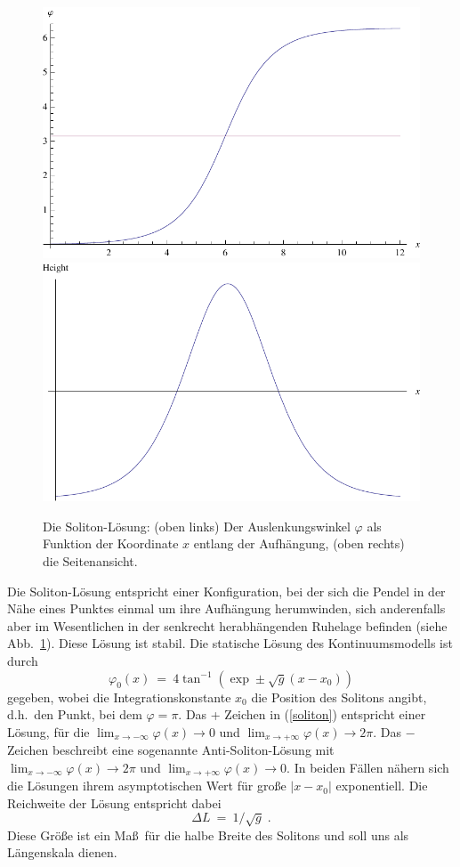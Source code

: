 \begin{figure}[htbp]
\includegraphics[width=0.47\linewidth,height=0.28\linewidth,clip]{./Bilder_SRT/Soliton_phi} \hspace{0.3cm}
\includegraphics[width=0.47\linewidth,height=0.28\linewidth,clip]{./Bilder_SRT/Soliton_Height}%
\caption[]{ \label{fig:Soliton}
Die Soliton-L\"osung: (oben links) Der Auslenkungswinkel $\varphi$ 
als Funktion der Koordinate $x$ entlang der Aufh\"angung,
(oben rechts) die Seitenansicht.}
\end{figure}

Die Soliton-L\"osung entspricht einer Konfiguration, bei der sich die
Pendel in der N\"ahe eines Punktes einmal um ihre Aufh\"angung herumwinden, 
sich anderenfalls aber im Wesentlichen in der
senkrecht herabh\"angenden Ruhelage befinden (siehe Abb.\ \ref{fig:Soliton}). 
Diese L\"osung ist stabil. 
Die statische L\"{o}sung des Kontinuumsmodells ist durch
\begin{equation}
\label{soliton}
      \varphi_0(x) ~=~ 4 \tan^{-1}
      \left( \exp \pm \sqrt{g}(x-x_0) \right) 
\end{equation}
gegeben, wobei die Integrationskonstante $x_0$ die Position
des Solitons angibt, d.h.\ den Punkt, bei dem $\varphi=\pi$. 
Das + Zeichen in (\ref{soliton}) entspricht einer L\"osung, f\"ur die
$\lim_{x\rightarrow -\infty} \varphi(x) \rightarrow 0$ und
$\lim_{x\rightarrow +\infty} \varphi(x) \rightarrow 2\pi$. Das $-$ 
Zeichen beschreibt eine so\-ge\-nann\-te Anti-Soliton-L\"osung mit
$\lim_{x\rightarrow -\infty} \varphi(x) \rightarrow 2\pi$ und
$\lim_{x\rightarrow +\infty} \varphi(x) \rightarrow 0$.
In beiden F\"allen n\"ahern sich die L\"osungen ihrem asymptotischen Wert
f\"ur gro\ss e $|x-x_0|$ exponentiell. Die Reichweite der L\"osung 
entspricht dabei
\begin{equation}
\label{width}
   \Delta L ~=~ 1/\sqrt{g}   \;.
\end{equation}
Diese Gr\"o\ss e ist ein Ma\ss\ f\"ur die halbe Breite des Solitons und
soll uns als L\"angenskala dienen. 

